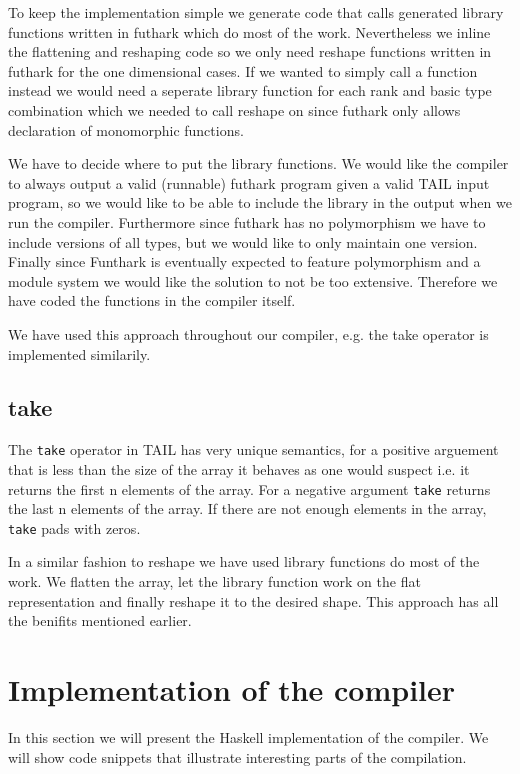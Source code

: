 \documentclass[11pt]{article}
\begin{document}
To keep the implementation simple we generate code that calls generated library functions written in futhark which do most of the work.
Nevertheless we inline the flattening and reshaping code so we only need reshape functions written in futhark
for the one dimensional cases. If we wanted to simply call a function instead we would need a seperate library function for each
rank and basic type combination which we needed to call reshape on since futhark only allows declaration of monomorphic functions.

We have to decide where to put the library functions.
We would like the compiler to always output a valid (runnable) futhark program given a valid TAIL input program, so we would like to
be able to include the library in the output when we run the compiler.
Furthermore since futhark has no polymorphism we have to include versions of all types, but we would like to only maintain one version.
Finally since Funthark is eventually expected to feature polymorphism and a module system we would like the solution to not be too
extensive. Therefore we have coded the functions in the compiler itself.

We have used this approach throughout our compiler, e.g. the take operator is implemented similarily.

\subsection{take} 

The {\tt take} operator in TAIL has very unique semantics, for a positive arguement that is less than the size of the array it behaves as one would suspect i.e. it returns the first n elements of the array. For a negative argument {\tt take} returns the last n elements of the array. If there are not enough elements in the array, {\tt take} pads with zeros.

In a similar fashion to reshape we have used library functions do most of the work.
We flatten the array, let the library function work on the flat representation and finally reshape it to the desired shape.
This approach has all the benifits mentioned earlier.

\section{Implementation of the compiler}
In this section we will present the Haskell implementation of the compiler. We will show code snippets that illustrate interesting parts of the compilation.
\end{document}
